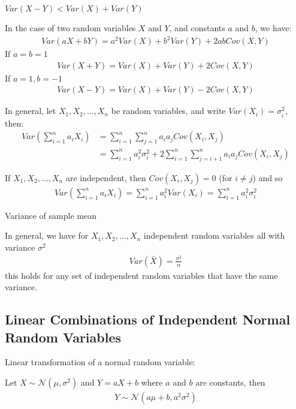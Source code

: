 \documentclass{article}
\begin{document}
$Var(X - Y) < Var(X) + Var(Y)$

In the case of two random variables $X$ and $Y$, and constants $a$ and $b$, we have:
\begin{align*}
    Var(aX + bY) = a^2Var(X) + b^2Var(Y) + 2abCov(X,Y)
\end{align*}
If $a = b = 1$
\begin{align*}
    Var(X + Y) = Var(X) + Var(Y) + 2Cov(X,Y) 
\end{align*}
If $a = 1, b = -1$
\begin{align*}
    Var(X-Y) = Var(X) + Var(Y) - 2Cov(X,Y)
\end{align*}


In general, let $X_1, X_2, \ldots, X_n$ be random variables, and write $Var(X_i) =  \sigma_i^2$, then:
\begin{align*}
    Var\left(\sum_{i=1}^na_iX_i\right) &= \sum_{i=1}^n \sum_{j=1}^n a_ia_jCov(X_i, X_j) \\
    &= \sum_{i=1}^n a_i^2 \sigma_i^2 + 2 \sum_{i=1}^n \sum_{j=i+1}^n a_ia_jCov(X_i,X_j)
\end{align*}

If $X_1, X_2, \ldots, X_n$ are independent, then $Cov(X_i, X_j) = 0$ (for $i \ne j$) and so
\begin{align*}
    Var \left ( \sum_{i=1}^na_iX_i \right ) = \sum_{i=1}^n a_i^2 Var(X_i) = \sum_{i=1}^n a_i^2 \sigma_i^2
\end{align*}

Variance of sample mean

In general, we have for $X_1, X_2, \ldots, X_n$ independent random variables all with variance $\sigma^2$
\begin{align*}
    Var(\bar{X}) = \frac{\sigma^2}{n}
\end{align*}
this holds for any set of independent random variables that have the same variance. 


\subsection{Linear Combinations of Independent Normal Random Variables}

Linear transformation of a normal random variable:

Let $X \sim \mathcal{N}(\mu, \sigma^2)$ and $Y = aX + b$ where $a$ and $b$ are constants, then
\begin{align*}
    Y \sim \mathcal{N}(a\mu + b, a^2\sigma^2)
\end{align*}
\end{document}
